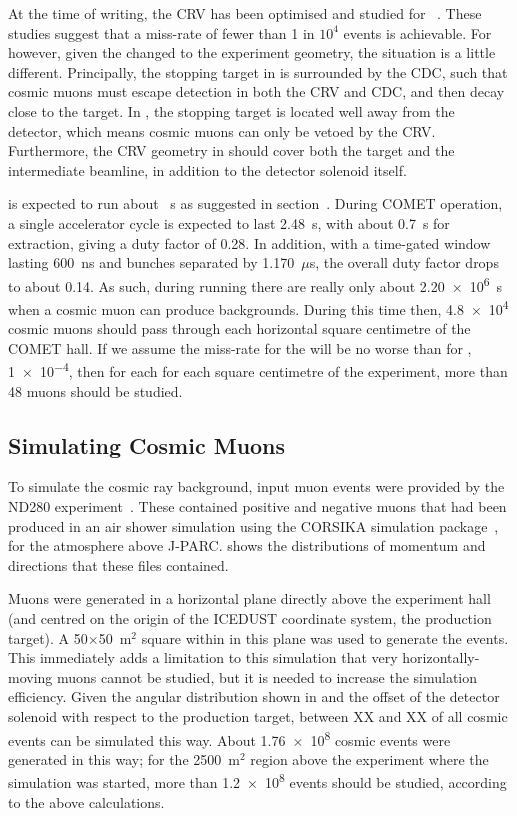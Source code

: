 At the time of writing, the \ac{CRV} has been optimised and studied for \phaseI~\cite{TDR2016,CM18:CRV,CM20:CRV}.
These studies suggest that a miss-rate of fewer than 1 in $10^4$ events is achievable.
For \phaseII however, given the changed to the experiment geometry, the situation is a little different.
Principally, the stopping target in \phaseI is surrounded by the \ac{CDC}, such that cosmic muons must escape detection in both the \ac{CRV} and \ac{CDC}, and then decay close to the target.
In \phaseII, the stopping target is located well away from the detector, which means cosmic muons can only be vetoed by the \ac{CRV}.
Furthermore, the \ac{CRV} geometry in \phaseII should cover both the target and the intermediate beamline, in addition to the detector solenoid itself.

\phaseII is expected to run about \VarRunTime~s as suggested in section~.
During COMET operation, a single accelerator cycle is expected to last 2.48~s, with about 0.7~s for extraction, giving a duty factor of 0.28.
In addition, with a time-gated window lasting 600~ns and bunches separated by 1.170~$\mu$s, the overall duty factor drops to about 0.14.
As such, during \phaseII running there are really only about \num{2.20e6}~s when a cosmic muon can produce backgrounds.
During this time then, \num{4.8e4} cosmic muons should pass through each horizontal square centimetre of the COMET hall.
If we assume the miss-rate for the \phaseII will be no worse than for \phaseI, \ie \num{1e-4}, then for each for each square centimetre of the experiment, more than 48 muons should be studied.

\subsection{Simulating Cosmic Muons}
To simulate the cosmic ray background, input muon events were provided by the ND280 experiment~\cite{George:2010aca}.
These contained positive and negative muons that had been produced in an air shower simulation using the CORSIKA simulation package~\cite{Corsika}, for the atmosphere above J-PARC.
 shows the distributions of momentum and directions that these files contained.

Muons were generated in a horizontal plane directly above the experiment hall (and centred on the origin of the ICEDUST coordinate system, the production target).
A 50$\times$50~m${}^2$ square within in this plane was used to generate the events.
This immediately adds a limitation to this simulation that very horizontally-moving muons cannot be studied, but it is needed to increase the simulation efficiency.
Given the angular distribution shown in  and the offset of the detector solenoid with respect to the production target, between XX and XX of all cosmic events can be simulated this way.
About \num{1.76e8} cosmic events were generated in this way; for the 2500~m${}^2$ region above the experiment where the simulation was started, more than \num{1.2e8} events should be studied, according to the above calculations.

